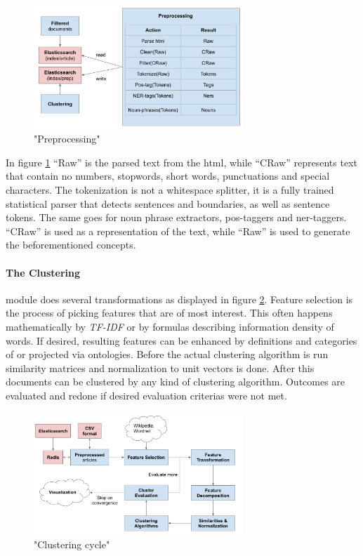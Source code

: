     \begin{figure}[h!]
      \centering
        \includegraphics[width=0.7\textwidth]{preprocessing.png}
        \caption{"Preprocessing"}
        \label{preprocessing}
    \end{figure} 

  In figure \ref{preprocessing} ``Raw'' is the parsed text from the html, while ``CRaw'' represents text that contain no numbers, stopwords, short words, punctuations and special characters. The tokenization is not a whitespace splitter, it is a fully trained statistical parser that detects sentences and boundaries, as well as sentence tokens. The same goes for noun phrase extractors, pos-taggers and ner-taggers. ``CRaw'' is used as a representation of the text, while ``Raw'' is used to generate the beforementioned concepts.

  \paragraph{The Clustering} module does several transformations as displayed in figure \ref{clustering_cycle}. Feature selection is the process of picking features that are of most interest. This often happens mathematically by \emph{TF-IDF} or by formulas describing information density of words. If desired, resulting features can be enhanced by definitions and categories of \wiki{} or projected via \wordnet{} ontologies. Before the actual clustering algorithm is run similarity matrices and normalization to unit vectors is done. After this documents can be clustered by any kind of clustering algorithm. Outcomes are evaluated and redone if desired evaluation criterias were not met.

  \newpage
    \begin{figure}[h!]
      \centering
        \includegraphics[width=0.7\textwidth]{clustering_cycle.png}
        \caption{"Clustering cycle"}
        \label{clustering_cycle}
    \end{figure} 

